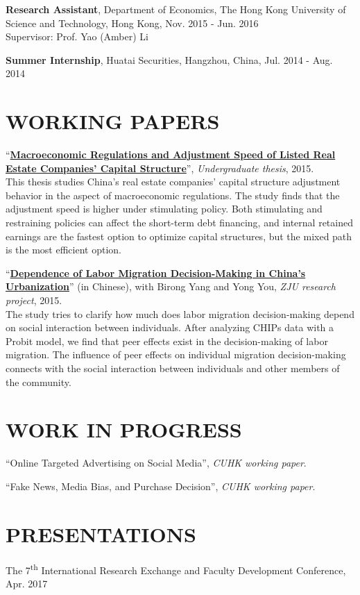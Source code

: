 \documentclass{res} 			%
\begin{document}
\begin{resume}
    {\bf Research Assistant},
    Department of Economics,
    The Hong Kong University of Science and Technology, Hong Kong,
    Nov. 2015 - Jun. 2016 \\
    Supervisor: Prof. Yao (Amber) Li
    
    {\bf Summer Internship}, 
    Huatai Securities, Hangzhou, China, 
    Jul. 2014 - Aug. 2014
    

\section{WORKING PAPERS} 
\vspace{0.1in}
	``{\bf \href{http://dongleizhang.com/file/zju_thesis.pdf}{Macroeconomic Regulations and Adjustment Speed of Listed Real Estate Companies' Capital Structure}}'', {\sl Undergraduate thesis}, 2015. \\
		This thesis studies China’s real estate companies’ capital structure adjustment behavior in the aspect of macroeconomic regulations. The study finds that the adjustment speed is higher under stimulating policy. Both stimulating and restraining policies can affect the short-term debt financing, and internal retained earnings are the fastest option to optimize capital structures, but the mixed path is the most efficient option.

	``{\bf \href{http://dongleizhang.com/file/labor_migration.pdf}{Dependence of Labor Migration Decision-Making in China's Urbanization}}'' (in Chinese), with Birong Yang and Yong You, {\sl ZJU research project}, 2015. \\
		The study tries to clarify how much does labor migration decision-making depend on social interaction between individuals. After analyzing CHIPs data with a Probit model, we find that peer effects exist in the decision-making of labor migration. The influence of peer effects on individual migration decision-making connects with the social interaction between individuals and other members of the community.


\section{WORK IN PROGRESS}
\vspace{0.1in}
	``Online Targeted Advertising on Social Media'', {\sl CUHK working paper}.
	
	``Fake News, Media Bias, and Purchase Decision'', {\sl CUHK working paper}.


\section{PRESENTATIONS} 
\vspace{0.1in}
	The 7\textsuperscript{th} International Research Exchange and Faculty Development Conference, Apr. 2017



\end{resume}
\end{document}
